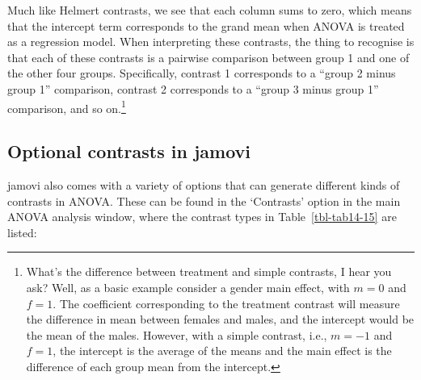 \documentclass[
  a4paper,
]{book}
\begin{document}
Much like Helmert contrasts, we see that each column sums to zero, which
means that the intercept term corresponds to the grand mean when ANOVA
is treated as a regression model. When interpreting these contrasts, the
thing to recognise is that each of these contrasts is a pairwise
comparison between group 1 and one of the other four groups.
Specifically, contrast 1 corresponds to a ``group 2 minus group 1''
comparison, contrast 2 corresponds to a ``group 3 minus group 1''
comparison, and so on.\footnote{What's the difference between treatment
  and simple contrasts, I hear you ask? Well, as a basic example
  consider a gender main effect, with \(m=0\) and \(f=1\). The
  coefficient corresponding to the treatment contrast will measure the
  difference in mean between females and males, and the intercept would
  be the mean of the males. However, with a simple contrast, i.e.,
  \(m=-1\) and \(f=1\), the intercept is the average of the means and
  the main effect is the difference of each group mean from the
  intercept.}

\hypertarget{optional-contrasts-in-jamovi}{%
\subsection{Optional contrasts in
jamovi}\label{optional-contrasts-in-jamovi}}

jamovi also comes with a variety of options that can generate different
kinds of contrasts in ANOVA. These can be found in the `Contrasts'
option in the main ANOVA analysis window, where the contrast types in
Table~\ref{tbl-tab14-15} are listed:

\hypertarget{tbl-tab14-15}{}
 
  \providecommand{\huxb}[2]{\arrayrulecolor[RGB]{#1}\global\arrayrulewidth=#2pt}
  \providecommand{\huxvb}[2]{\color[RGB]{#1}\vrule width #2pt}
  \providecommand{\huxtpad}[1]{\rule{0pt}{#1}}
  \providecommand{\huxbpad}[1]{\rule[-#1]{0pt}{#1}}
\end{document}
